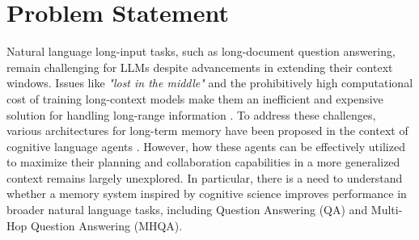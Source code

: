 \section{Problem Statement}
\label{sec:problemStatement}

Natural language long-input tasks, such as long-document question answering, remain challenging for LLMs despite advancements in extending their context windows. Issues like \textit{"lost in the middle"} and the prohibitively high computational cost of training long-context models make them an inefficient and expensive solution for handling long-range information \cite{liu2023lostmiddlelanguagemodels}\cite{kitaev2020reformerefficienttransformer}. To address these challenges, various architectures for long-term memory have been proposed in the context of cognitive language agents \cite{sumers2024cognitive}\cite{packer2024memgptllmsoperatingsystems}\cite{li2024graphreaderbuildinggraphbasedagent}\cite{anokhin2024arigraphlearningknowledgegraph}\cite{zhao-etal-2024-longagent}. However, how these agents can be effectively utilized to maximize their planning and collaboration capabilities in a more generalized context remains largely unexplored. In particular, there is a need to understand whether a memory system inspired by cognitive science improves performance in broader natural language tasks, including Question Answering (QA) and Multi-Hop Question Answering (MHQA). 
